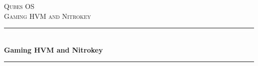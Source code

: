 \documentclass[12pt]{article}
\begin{document}
\begin{titlepage}

  \newcommand{\HRule}{\rule{\linewidth}{0.5mm}} %

  \center %


  \textsc{\LARGE Qubes OS}\\[1.5cm] %
  \textsc{\Large Gaming HVM and Nitrokey}\\[0.5cm] %


  \HRule \\[0.4cm]
  { \huge \bfseries Gaming HVM and Nitrokey}\\[0.4cm] %
  \HRule \\[1.5cm]




\end{titlepage}
\end{document}
